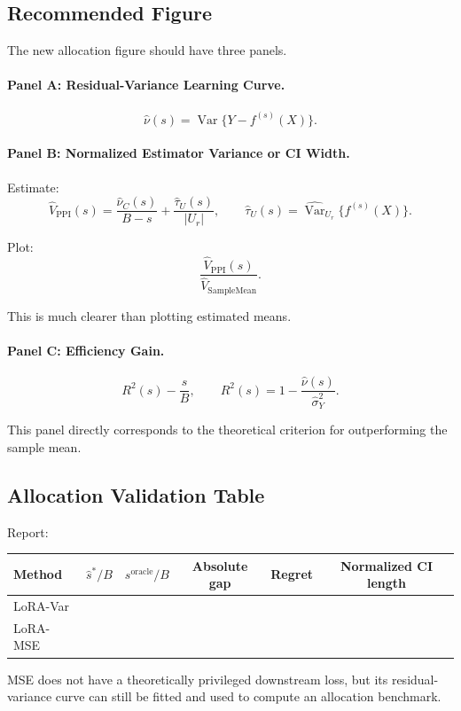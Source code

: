 \documentclass[11pt]{article}
\begin{document}
\subsection{Recommended Figure}

The new allocation figure should have three panels.

\paragraph{Panel A: Residual-Variance Learning Curve.}
\[
\widehat\nu(s)=\widehat{\operatorname{Var}}\{Y-f^{(s)}(X)\}.
\]

\paragraph{Panel B: Normalized Estimator Variance or CI Width.}
Estimate:
\[
\widehat V_{\mathrm{PPI}}(s)
=
\frac{\widehat{\nu}_C(s)}{B-s}
+
\frac{\widehat\tau_U(s)}{|U_r|},
\qquad
\widehat\tau_U(s)=\widehat{\operatorname{Var}}_{U_r}\{f^{(s)}(X)\}.
\]

Plot:
\[
\frac{\widehat V_{\mathrm{PPI}}(s)}{\widehat V_{\mathrm{SampleMean}}}.
\]

This is much clearer than plotting estimated means.

\paragraph{Panel C: Efficiency Gain.}
\[
R^2(s)-\frac{s}{B},
\qquad
R^2(s)=1-\frac{\widehat\nu(s)}{\widehat\sigma_Y^2}.
\]

This panel directly corresponds to the theoretical criterion for outperforming the sample mean.

\subsection{Allocation Validation Table}

Report:

\begin{longtable}{p{}ccccc}
\toprule
Method & $\hat s^*/B$ & $s^{\mathrm{oracle}}/B$ & Absolute gap & Regret & Normalized CI length \\
\midrule
LoRA-Var &  &  &  &  &  \\
LoRA-MSE &  &  &  &  &  \\
\bottomrule
\end{longtable}

MSE does not have a theoretically privileged downstream loss, but its residual-variance curve can still be fitted and used to compute an allocation benchmark.
\end{document}
